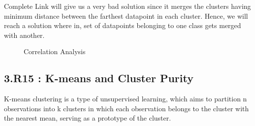 \documentclass[paper=a4, fontsize=11pt]{scrartcl}
\numberwithin{equation}{section}		%
\numberwithin{figure}{section}			%
\numberwithin{table}{section}				%
\begin{document}
Complete Link will give us a very bad solution since it merges the clusters having minimum distance between the farthest datapoint in each cluster. Hence, we will reach a solution where in, set of datapoints belonging to one class gets merged with another.

\begin{figure}[H]
  \centering
  \hfill
  \caption*{Correlation Analysis}
\end{figure}


\subsection*{3.R15 : K-means and Cluster Purity}
K-means clustering is a type of unsupervised learning, which aims to partition n observations into k clusters in which each observation belongs to the cluster with the nearest mean, serving as a prototype of the cluster.\\
\end{document}
